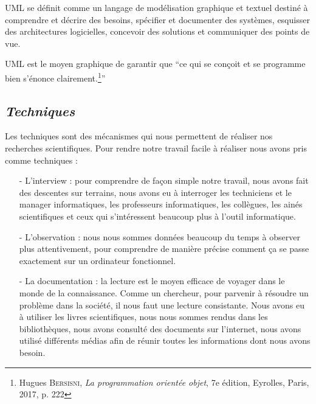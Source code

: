 \documentclass[a4paper,12pt,oneside]{book}
\begin{document}
            UML se définit comme un langage de modélisation graphique et textuel destiné à
            comprendre et décrire des besoins, spécifier et documenter des systèmes, esquisser des
            architectures logicielles, concevoir des solutions et communiquer des points de vue.\cite{RoqVall2007}
            \newline
            
            UML est le moyen graphique de garantir que \enquote{ce qui se conçoit et se programme
            bien s’énonce clairement.\footnote[2]{Hugues \textsc{Bersisni}, \textit{La programmation orientée objet}, 7e édition, Eyrolles, Paris, 2017, p. 222}}
            \subsection[Techniques]{\textit{Techniques}}
            Les techniques sont des mécanismes qui nous permettent de réaliser nos recherches
            scientifiques. Pour rendre notre travail facile à réaliser nous avons pris comme techniques : 
            \newline
            \begin{itemize}
                \item [-] L'interview : pour comprendre de façon simple notre travail, nous avons fait des
                descentes sur terrains, nous avons eu à interroger les techniciens et le manager
                informatiques, les professeurs informatiques, les collègues, les ainés scientifiques
                et ceux qui s’intéressent beaucoup plus à l’outil informatique.
                \newline
                \item [-] L'observation : nous nous sommes données beaucoup du temps à observer plus
                attentivement, pour comprendre de manière précise comment ça se passe exactement sur un ordinateur fonctionnel.
                \newline
                \item [-] La documentation : la lecture est le moyen efficace de voyager dans le monde
                de la connaissance. Comme un chercheur, pour parvenir à résoudre un problème
                dans la société, il nous faut une lecture consistante. Nous avons eu à utiliser les
                livres scientifiques, nous nous sommes rendus dans les bibliothèques, nous avons
                consulté des documents sur l’internet, nous avons utilisé différents médias afin de
                réunir toutes les informations dont nous avons besoin.
            \end{itemize}
\end{document}
